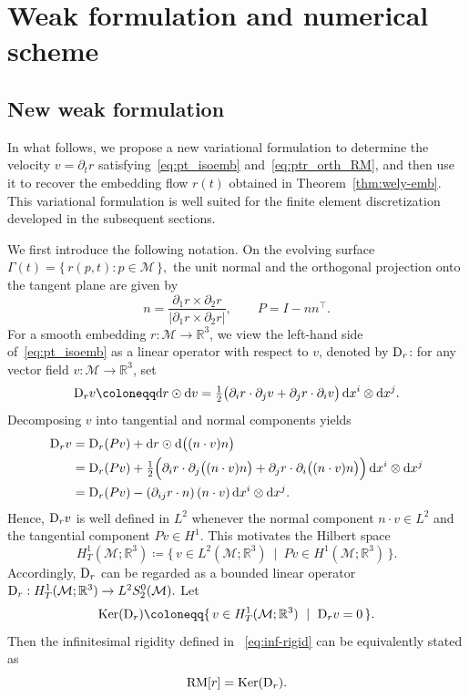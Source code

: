 \documentclass[11pt,a4paper,oneside,reqno]{amsart}
\theoremstyle{definition}
\theoremstyle{plain}
\numberwithin{theorem}{section}
\numberwithin{proposition}{section}
\numberwithin{lemma}{section}
\numberwithin{equation}{section}
\newcommand{\Ker}{\text{Ker}}
\newcommand{\Man}{\mathcal{M}}
\newcommand{\RM}{\mathrm{RM}}
\begin{document}
\section{Weak formulation and numerical scheme}\label{sec:num}


\subsection{New weak formulation}

In what follows, we propose a new variational formulation to determine the velocity \(v=\partial_t r\) satisfying~\eqref{eq:pt_isoemb} and~\eqref{eq:ptr_orth_RM}, and then use it to recover the embedding flow \(r(t)\) obtained in Theorem~\ref{thm:wely-emb}.
This variational formulation is well suited for the finite element discretization developed in the subsequent sections.

We first introduce the following notation. On the evolving surface
\(
\Gamma(t)=\{\,r(p,t):p\in\Man\,\},
\)
the unit normal and the orthogonal projection onto the tangent plane are given by
\[
n=\frac{\partial_1 r\times \partial_2 r}{\lvert \partial_1 r\times \partial_2 r\rvert},
\qquad
P=I-nn^{\top}.
\]
For a smooth embedding \(r:\Man\to\mathbb{R}^3\), we view the left-hand side of~\eqref{eq:pt_isoemb} as a linear operator with respect to \(v\), denoted by \({\rm D}_r\):
for any vector field \(v:\Man\to\mathbb{R}^3\), set
\begin{equation}\label{eq:def-Dr}
{\rm D}_r v \coloneqq \mathrm{d}r \odot \mathrm{d}v
= \tfrac12\big(\partial_i r\cdot \partial_j v+\partial_j r\cdot \partial_i v\big)\,
\mathrm{d}x^i\otimes \mathrm{d}x^j .
\end{equation}
Decomposing \(v\) into tangential and normal components yields
\begin{equation}\label{eq:TanH1_NorL2}
\begin{aligned}
{\rm D}_r v
&= {\rm D}_r(Pv) + \mathrm{d}r \odot \mathrm{d}\big((n\cdot v)n\big) \\
&= {\rm D}_r(Pv)
+ \tfrac12\Big(\partial_i r\cdot \partial_j\big((n\cdot v)n\big)
            +\partial_j r\cdot \partial_i\big((n\cdot v)n\big)\Big)\,
   \mathrm{d}x^i\otimes \mathrm{d}x^j \\
&= {\rm D}_r(Pv) - (\partial_{ij}r\cdot n)\,(n\cdot v)\,\mathrm{d}x^i\otimes \mathrm{d}x^j .
\end{aligned}
\end{equation}
Hence, \({\rm D}_r v\) is well defined in \(L^2\) whenever the normal component \(n\cdot v\in L^2\) and the tangential component \(Pv\in H^1\).
This motivates the Hilbert space
\[
H^1_T(\Man;\mathbb{R}^3)
\coloneqq\{\, v\in L^2(\Man;\mathbb{R}^3)\ \mid\ Pv\in H^1(\Man;\mathbb{R}^3)\,\}.
\]
Accordingly, \({\rm D}_r\) can be regarded as a bounded linear operator
\(
{\rm D}_r: H^1_T(\Man;\mathbb{R}^3)\to L^2S^0_2(\Man).
\)
Let
\[
\Ker({\rm D}_r)\coloneqq\{\, v\in H^1_T(\Man;\mathbb{R}^3)\ \mid\ {\rm D}_r v=0\,\}.
\]
Then the infinitesimal rigidity defined in ~\eqref{eq:inf-rigid} can be equivalently stated as
\begin{equation}\label{eq:rigid}
\RM[r]=\Ker({\rm D}_r).
\end{equation}
\end{document}
